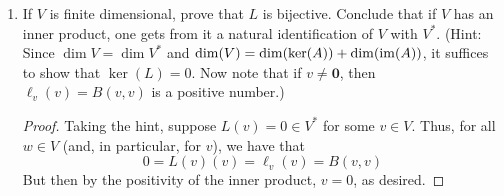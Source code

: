 \documentclass[../psets.tex]{subfiles}
\begin{document}
\begin{enumerate}[label={\textbf{1.2.\roman*.}}]
\begin{enumerate}
\begin{proof}
\begin{align*}
                    &= \lambda\ell_v(w)\\
                &= L(v_1)(w)+L(v_2)(w)&
                    &= \lambda L(v)(w)\\
                &= [L(v_1)+L(v_2)](w)&
                    &= [\lambda L(v)](w)
            \end{align*}
            we know that the functions $L(v_1+v_2)$ and $L(v_1)+L(v_2)$ have the same action on every $w\in V$. Thus they are equal. A symmetric statement holds for $L(\lambda v)$ and $\lambda L(v)$.
        \end{proof}
        \item If $V$ is finite dimensional, prove that $L$ is bijective. Conclude that if $V$ has an inner product, one gets from it a natural identification of $V$ with $V^*$. (Hint: Since $\dim V=\dim V^*$ and $\dim(V)=\dim(\ker(A))+\dim(\operatorname{im}(A))$, it suffices to show that $\ker(L)=0$. Now note that if $v\neq\bm{0}$, then $\ell_v(v)=B(v,v)$ is a positive number.)
        \begin{proof}
            Taking the hint, suppose $L(v)=0\in V^*$ for some $v\in V$. Thus, for all $w\in V$ (and, in particular, for $v$), we have that
            \begin{equation*}
                0 = L(v)(v)
                = \ell_v(v)
                = B(v,v)
            \end{equation*}
            But then by the positivity of the inner product, $v=0$, as desired.
        \end{proof}
    \end{enumerate}
\end{enumerate}
\end{document}
